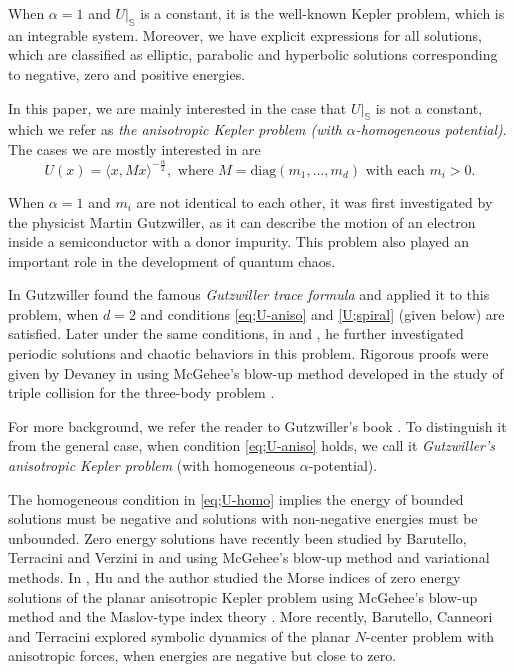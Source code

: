 \documentclass[11pt]{amsart}
\newcommand{\bs}{\mathbb S}
\newcommand{\al}{\alpha}
\theoremstyle{plain}
\theoremstyle{definition}
\theoremstyle{remark}
\begin{document}
When $\al=1$ and $U|_{\bs}$ is a constant, it is the well-known Kepler problem, which is an integrable system. Moreover, we have explicit expressions for all solutions, which are classified as elliptic, parabolic and hyperbolic solutions corresponding to negative, zero and positive energies. 

In this paper, we are mainly interested in the case that $U|_{\bs}$ is not a constant, which we refer as \emph{the anisotropic Kepler problem (with $\al$-homogeneous potential)}. The cases we are mostly interested in are 
\begin{equation} \tag{U1}
\label{eq;U-aniso} U(x) = \langle x, M x \rangle^{-\frac{\al}{2}}, \text{ where } M = \text{diag}(m_1, \dots, m_d) \text{ with each } m_i >0. 
\end{equation}

When $\al=1$ and $m_i$ are not identical to each other, it was first investigated by the physicist Martin Gutzwiller, as it can describe the motion of an electron inside a semiconductor with a donor impurity. This problem also played an important role in the development of quantum chaos. 

In \cite{Gutz71} Gutzwiller found the famous \emph{Gutzwiller trace formula} and applied it to this problem, when $d=2$ and conditions \eqref{eq;U-aniso} and \eqref{U;spiral} (given below) are satisfied. Later under the same conditions, in \cite{Gutz73} and \cite{Gutz77}, he further investigated periodic solutions and chaotic behaviors in this problem. Rigorous proofs were given by Devaney in \cite{Dev78a} using McGehee's blow-up method developed in the study of triple collision for the three-body problem \cite{Mg74}. 



For more background, we refer the reader to Gutzwiller's book \cite{Gutz90}. To distinguish it from the general case, when condition \eqref{eq;U-aniso} holds, we call it \emph{Gutzwiller's anisotropic Kepler problem} (with homogeneous $\al$-potential).


The homogeneous condition in \eqref{eq;U-homo} implies the energy of bounded solutions must be negative and solutions with non-negative energies must be unbounded. Zero energy solutions have recently been studied by Barutello, Terracini and Verzini in \cite{BTV13}  and \cite{BTV14}  using McGehee's blow-up method and variational methods. In \cite{HY18}, Hu and the author studied the Morse indices of zero energy solutions of the planar anisotropic Kepler problem using McGehee's blow-up method and the Maslov-type index theory \cite{Long02}. More recently, Barutello, Canneori and Terracini \cite{BCT21} explored symbolic dynamics of the planar $N$-center problem with anisotropic forces, when energies are negative but close to zero. 
\end{document}

